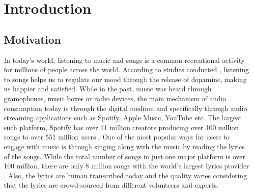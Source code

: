 
\chapter{Introduction}%
\label{sec:introduction}

\section{Motivation}%
\label{sec:motivation}

In today’s world, listening to music and songs is a common recreational activity for millions of people across the world. According to studies conducted \cite{salimpoor2011anatomically}, listening to songs helps us to regulate our mood through the release of dopamine, making us happier and satisfied. While in the past, music was heard through gramophones, music boxes or radio devices, the main mechanism of audio consumption today is through the digital medium and specifically through audio streaming applications such as Spotify, Apple Music, YouTube etc. The largest such platform, Spotify has over 11 million creators producing over 100 million songs to over 551 million users \cite{Spotify_2023} . One of the most popular ways for users to engage with music is through singing along with the music by reading the lyrics of the songs. While the total number of songs in just one major platform is over 100 million, there are only 8 million songs with the world’s largest lyrics provider \cite{musixmatch_2023}. Also, the lyrics are human transcribed today and the quality varies considering that the lyrics are crowd-sourced from different volunteers and experts.

